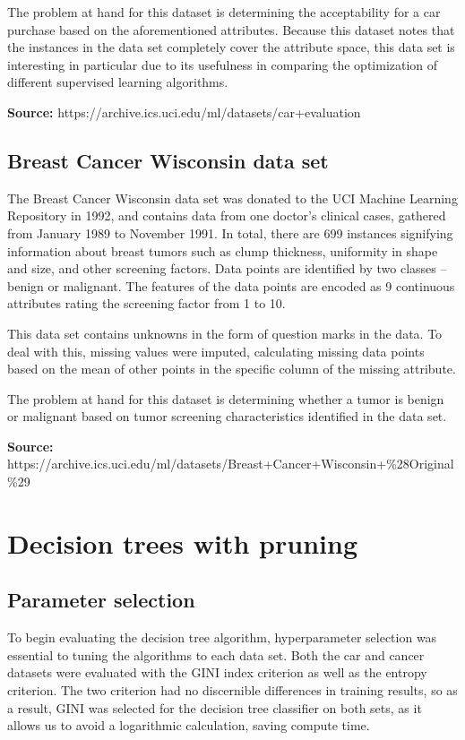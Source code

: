 \documentclass{article}
\begin{document}
    The problem at hand for this dataset is determining the acceptability for a car purchase based on the aforementioned attributes. Because this dataset notes that the instances in the data set completely cover the attribute space, this data set is interesting in particular due to its usefulness in comparing the optimization of different supervised learning algorithms.

    \textbf{Source:} https://archive.ics.uci.edu/ml/datasets/car+evaluation

    \subsection{Breast Cancer Wisconsin data set}
    The Breast Cancer Wisconsin data set was donated to the UCI Machine Learning Repository in 1992, and contains data from one doctor's clinical cases, gathered from January 1989 to November 1991. In total, there are 699 instances signifying information about breast tumors such as clump thickness, uniformity in shape and size, and other screening factors. Data points are identified by two classes -- benign or malignant. The features of the data points are encoded as 9 continuous attributes rating the screening factor from 1 to 10.

    This data set contains unknowns in the form of question marks in the data. To deal with this, missing values were imputed, calculating missing data points based on the mean of other points in the specific column of the missing attribute. 

    The problem at hand for this dataset is determining whether a tumor is benign or malignant based on tumor screening characteristics identified in the data set.

    \textbf{Source:} https://archive.ics.uci.edu/ml/datasets/Breast+Cancer+Wisconsin+\%28Original\%29

    \section{Decision trees with pruning}

    \subsection{Parameter selection}
    To begin evaluating the decision tree algorithm, hyperparameter selection was essential to tuning the algorithms to each data set. Both the car and cancer datasets were evaluated with the GINI index criterion as well as the entropy criterion. The two criterion had no discernible differences in training results, so as a result, GINI was selected for the decision tree classifier on both sets, as it allows us to avoid a logarithmic calculation, saving compute time.
\end{document}
